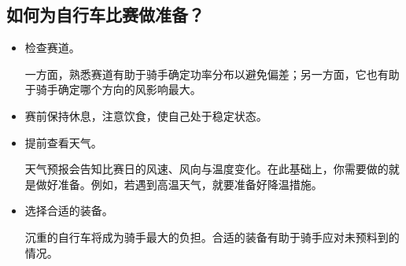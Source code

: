 \documentclass[11pt,a4paper]{ctexart}
\begin{document}
\subsection*{如何为自行车比赛做准备？}

\begin{itemize}
\item 检查赛道。

一方面，熟悉赛道有助于骑手确定功率分布以避免偏差；另一方面，它也有助于骑手确定哪个方向的风影响最大。

\item 赛前保持休息，注意饮食，使自己处于稳定状态。

\item 提前查看天气。

天气预报会告知比赛日的风速、风向与温度变化。在此基础上，你需要做的就是做好准备。例如，若遇到高温天气，就要准备好降温措施。

\item 选择合适的装备。

沉重的自行车将成为骑手最大的负担。合适的装备有助于骑手应对未预料到的情况。
\end{itemize}
\end{document}
